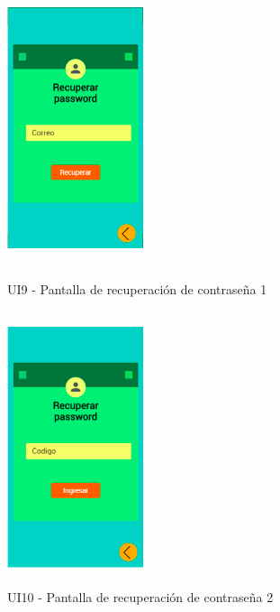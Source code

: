 \begin{figure}[h!]
	\begin{minipage}{0.48\textwidth}
		\centering
		\includegraphics[width=4cm,height=8cm]{imagenes/Anexos/Mockup/9-RecuperarP.PNG}
		\caption{UI9 - Pantalla de recuperación de contraseña 1}
		\label{fig:analogo}
	\end{minipage}\hfill
	\begin{minipage}{0.48\textwidth}
		\centering
		\includegraphics[width=4cm,height=8cm]{imagenes/Anexos/Mockup/10-RecuperarP2.PNG}
		\caption{UI10 - Pantalla de recuperación de contraseña 2}
		\label{fig:analogo}
	\end{minipage}\hfill
\end{figure}


